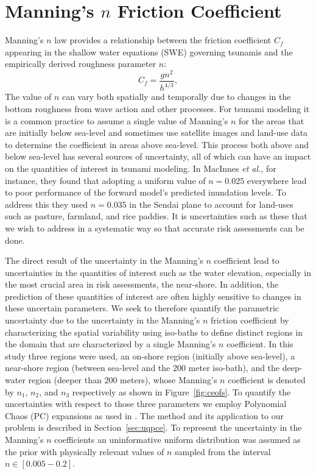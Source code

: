 \section{Manning’s $n$ Friction Coefficient} \label{sec:manning}

Manning's $n$ law provides a relationship between the friction coefficient
$C_f$ appearing in the shallow water equations (SWE) governing tsunamis and 
the empirically derived roughness parameter $n$:
\begin{equation}
    C_f = \frac{g n^2}{h^{4/3}},
\label{eq:coef}
\end{equation}
The value of $n$ can vary both spatially and temporally due to changes in the
bottom roughness from wave action and other processes.  For tsunami modeling it
is a common practice to assume a single value of Manning's $n$ for the areas
that are initially below sea-level and sometimes use satellite images and 
land-use data to determine the coefficient in areas above sea-level.  This
process both above and below sea-level has several sources of uncertainty, all
of which can have an impact on the quantities of interest in tsunami modeling.   
In MacInnes \emph{et al.}, for
instance, they found that adopting a uniform value of $n = 0.025$ everywhere
lead to poor performance of the forward model's predicted inundation levels.  To
address this they used $n = 0.035$ in the Sendai plane to account for land-uses 
such as pasture, farmland, and rice paddies.  It is uncertainties such as these 
that we wish to address in a systematic way so that accurate risk assessments 
can be done.

The direct result of the uncertainty in the Manning's $n$ coefficient lead to
uncertainties in the quantities of interest such as the water elevation,
especially in the most crucial area in risk assessments, the near-shore. In 
addition,  the prediction of these quantities of interest are often highly 
sensitive to changes in these uncertain parameters.  We seek to therefore 
quantify the parametric uncertainty due to the uncertainty in the Manning's $n$ 
friction coefficient by characterizing the spatial variability using
iso-baths to define distinct regions in the domain that are characterized by a
single Manning's $n$ coefficient.  In this study three regions were used, an
on-shore region (initially above sea-level), a near-shore region (between
sea-level and the 200 meter iso-bath), and the deep-water region (deeper than
200 meters), whose Manning's $n$ coefficient is denoted by $n_1$, $n_2$, and $n_3$ respectively 
as shown in Figure~\ref{fig:ceofs}. To quantify the uncertainties
with respect to those three parameters we employ Polynomial Chaos (PC) 
expansions as used in \cite{sraj:2013a,sraj:2013b}.  The method and its 
application to our problem is
described in Section~\ref{sec:uqpce}.  To represent the uncertainty in the
Manning's $n$ coefficients an uninformative uniform distribution was assumed as 
the prior with physically relevant values of $n$ sampled from the interval 
$n \in [0.005-0.2]$.

